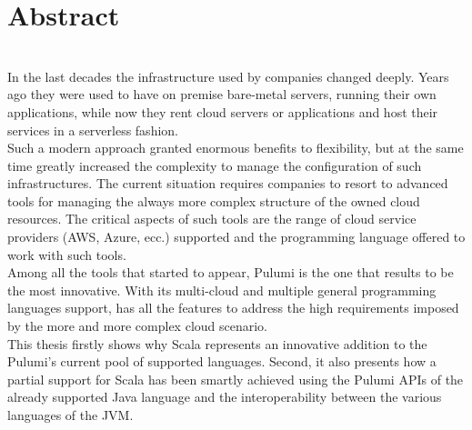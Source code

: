 
{}
{}
\begingroup
\let\clearpage\relax
\let\cleardoublepage\relax
\let\cleardoublepage\relax

\chapter{Abstract}

\\
\newline
In the last decades the infrastructure used by companies changed deeply.
Years ago they were used to have on premise bare-metal servers, running their own applications, while now they rent cloud servers or applications and host their services in a serverless fashion.\\
Such a modern approach granted enormous benefits to flexibility, but at the same time greatly increased the complexity to manage the configuration of such infrastructures.
The current situation requires companies to resort to advanced tools for managing the always more complex structure of the owned cloud resources.
The critical aspects of such tools are the range of cloud service providers (AWS, Azure, ecc.) supported and the programming language offered to work with such tools.\\
Among all the tools that started to appear, Pulumi is the one that results to be the most innovative.
With its multi-cloud and multiple general programming languages support, has all the features to address the high requirements imposed by the more and more complex cloud scenario.\\
This thesis firstly shows why Scala represents an innovative addition to the Pulumi's current pool of supported languages.
Second, it also presents how a partial support for Scala has been smartly achieved using the Pulumi APIs of the already supported Java language and the interoperability between the various languages of the JVM.  %
\newline
\newline
\newline
